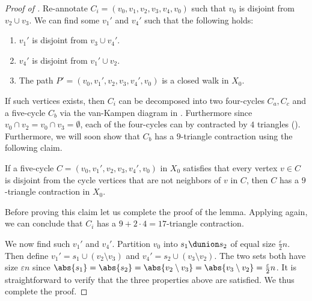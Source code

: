\begin{proof}[Proof of ]
    Re-annotate \(C_i=(v_0,v_1,v_2,v_3,v_4,v_0)\) such that \(v_0\) is disjoint from \(v_2 \cup v_3\).
    We can find some \(v_1'\) and \(v_4'\) such that the following holds:
    \begin{enumerate}
        \item $v_1'$ is disjoint from $v_3\cup v_4'$.
        \item $v_4'$ is disjoint from $v_1'\cup v_2$.
        \item The path \(P'=(v_0,v_1',v_2,v_3,v_4',v_0)\) is a closed walk in \(X_0\).
    \end{enumerate}
    If such vertices exists, then $C_i$ can be decomposed into two four-cycles $C_a, C_c$ and a five-cycle $C_b$ via the van-Kampen diagram in . Furthermore since $v_0\cap v_2 = v_0\cap v_3 = \emptyset$, each of the four-cycles can by contracted by $4$ triangles (). Furthermore, we will soon show that $C_b$ has a $9$-triangle contraction using the following claim.
    \begin{claim}\label{claim:disjoint-five-cycle}
       If a five-cycle $C = (v_0,v_1',v_2,v_3,v_4',v_0)$ in $X_0$ satisfies that every vertex $v \in C$ is disjoint from the cycle vertices that are not neighbors of $v$ in $C$, then $C$ has a $9$-triangle contraction in $X_0$.
    \end{claim}
    Before proving this claim let us complete the proof of the lemma.
    Applying  again, we can conclude that $C_i$ has a $9+ 2\cdot 4 = 17$-triangle contraction. 

    We now find such $v_1'$ and $v_4'$. Partition $v_0$ into $s_1\dunion s_2$ of equal size $\frac{\varepsilon}{2}n$. Then define $v_1' = s_1  \cup (v_2\setminus v_3)$ and $v_4' = s_2 \cup (v_3\setminus v_2) $. The two sets both have size $\varepsilon n$ since $\abs{s_1} = \abs{s_2} = \abs{v_2\setminus v_3} = \abs{v_3\setminus v_2} = \frac{\varepsilon}{2}n$. It is straightforward to verify that the three properties above are satisfied. We thus complete the proof. 



\end{proof}
